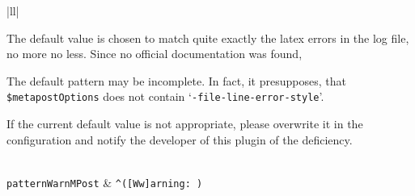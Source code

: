\begin{longtable}{|ll|}
{\begin{minipage}{0.95\linewidth}
The default value is chosen to match quite exactly 
the latex errors in the log file, no more no less. 
Since no official documentation was found, 

The default pattern may be incomplete. 
In fact, it presupposes, that \texttt{\$metapostOptions}  
does not contain `\texttt{-file-line-error-style}'.   

If the current default value is not appropriate, 
please overwrite it in the configuration 
and notify the developer of this plugin of the deficiency. 
\end{minipage}
} \\
\texttt{patternWarnMPost} & \texttt{\^{}([Ww]arning: )} \\%
\end{longtable}
